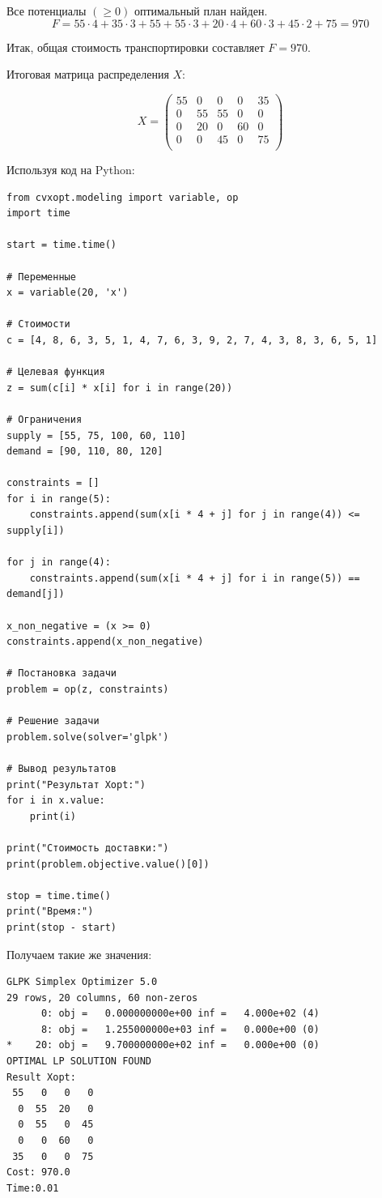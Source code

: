 \documentclass{article}
\begin{document}
Все потенциалы \( (\geq 0) \) оптимальный план найден.\\

\[
    F = 55 \cdot 4 + 35 \cdot 3 + 55 + 55 \cdot 3 + 20 \cdot 4 + 60 \cdot 3 + 45 \cdot 2 + 75 = 970
\]

Итак, общая стоимость транспортировки составляет \(F = 970\).

Итоговая матрица распределения \(X\):

\[
    X = \begin{pmatrix}
        55 & 0  & 0  & 0  & 35 \\
        0  & 55 & 55 & 0  & 0  \\
        0  & 20 & 0  & 60 & 0  \\
        0  & 0  & 45 & 0  & 75 \\
    \end{pmatrix}
\]

Используя код на Python:

\begin{verbatim}
from cvxopt.modeling import variable, op
import time

start = time.time()

# Переменные
x = variable(20, 'x')

# Стоимости
c = [4, 8, 6, 3, 5, 1, 4, 7, 6, 3, 9, 2, 7, 4, 3, 8, 3, 6, 5, 1]

# Целевая функция
z = sum(c[i] * x[i] for i in range(20))

# Ограничения
supply = [55, 75, 100, 60, 110]
demand = [90, 110, 80, 120]

constraints = []
for i in range(5):
    constraints.append(sum(x[i * 4 + j] for j in range(4)) <= supply[i])

for j in range(4):
    constraints.append(sum(x[i * 4 + j] for i in range(5)) == demand[j])

x_non_negative = (x >= 0)
constraints.append(x_non_negative)

# Постановка задачи
problem = op(z, constraints)

# Решение задачи
problem.solve(solver='glpk')

# Вывод результатов
print("Результат Xopt:")
for i in x.value:
    print(i)

print("Стоимость доставки:")
print(problem.objective.value()[0])

stop = time.time()
print("Время:")
print(stop - start)
\end{verbatim}

Получаем такие же значения:
\begin{verbatim}
GLPK Simplex Optimizer 5.0
29 rows, 20 columns, 60 non-zeros
      0: obj =   0.000000000e+00 inf =   4.000e+02 (4)
      8: obj =   1.255000000e+03 inf =   0.000e+00 (0)
*    20: obj =   9.700000000e+02 inf =   0.000e+00 (0)
OPTIMAL LP SOLUTION FOUND
Result Xopt:
 55   0   0   0 
  0  55  20   0 
  0  55   0  45 
  0   0  60   0 
 35   0   0  75 
Cost: 970.0
Time:0.01
\end{verbatim}
\end{document}
